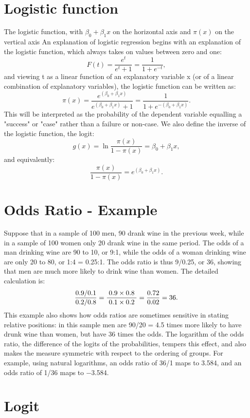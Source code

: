 \documentclass[a4paper,12pt]{article}
\begin{document}
\section*{Logistic function} 

The logistic function, with $\beta_0 + \beta_1 x$ on the horizontal axis and $\pi(x)$ on the vertical axis
An explanation of logistic regression begins with an explanation of the logistic function, which always takes on values between zero and one:
\[
F(t) = \frac{e^t}{e^t+1} = \frac{1}{1+e^{-t}},
\]
and viewing t as a linear function of an explanatory variable x (or of a linear combination of explanatory variables), the logistic function can be written as:
\[\pi(x) = \frac{e^{(\beta_0 + \beta_1 x)}} {e^{(\beta_0 + \beta_1 x)} + 1} = \frac {1} {1+e^{-(\beta_0 + \beta_1 x)}}.
\]
This will be interpreted as the probability of the dependent variable equalling a "success" or "case" rather than a failure or non-case. We also define the inverse of the logistic function, the logit:
\[g(x) = \ln \frac {\pi(x)} {1 - \pi(x)} = \beta_0 + \beta_1 x ,
\]and equivalently:
\[\frac{\pi(x)} {1 - \pi(x)} = e^{(\beta_0 + \beta_1 x)}.
\]

\section*{Odds Ratio - Example}

Suppose that in a sample of 100 men, 90 drank wine in the previous week, while in a sample of 100 women only 20 drank wine in the same period. The odds of a man drinking wine are 90 to 10, or 9:1, while the odds of a woman drinking wine are only 20 to 80, or 1:4 = 0.25:1. The odds ratio is thus 9/0.25, or 36, showing that men are much more likely to drink wine than women. The detailed calculation is:
\[{ 0.9/0.1 \over 0.2/0.8}=\frac{\;0.9\times 0.8\;}{\;0.1\times 0.2\;} ={0.72 \over 0.02} = 36.\]
This example also shows how odds ratios are sometimes sensitive in stating relative positions: in this sample men are 90/20 = 4.5 times more likely to have drunk wine than women, but have 36 times the odds. The logarithm of the odds ratio, the difference of the logits of the probabilities, tempers this effect, and also makes the measure symmetric with respect to the ordering of groups. For example, using natural logarithms, an odds ratio of 36/1 maps to 3.584, and an odds ratio of 1/36 maps to −3.584.
\section*{Logit}
\end{document}
